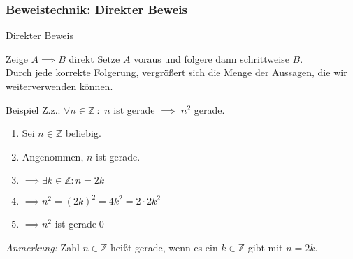 %
%
%
%

\subsubsection{Beweistechnik: Direkter Beweis}
\begin{frame}[fragile]{Direkter Beweis}
    \begin{alertblock}{Zeige $A\implies B$ direkt}
    Setze $A$ voraus und folgere dann schrittweise $B$.\\
    Durch jede korrekte Folgerung, vergrößert sich die Menge der Aussagen, die wir weiterverwenden können.
    \end{alertblock}
    \begin{exampleblock}{Beispiel}
    Z.z.: \alert<2|handout:0>{$\forall n\in\mathbb{Z}$}$\ :$ \alert<3|handout:0>{$n$ ist gerade} $\implies$ \alert<6|handout:0>{$n^2$ gerade.}
    \begin{enumerate}
        \item \alert<2|handout:0>{Sei $n\in\mathbb{Z}$ beliebig.}
        \item \alert<3|handout:0>{Angenommen, $n$ ist gerade.}
        \item \alert<4|handout:0>{$\implies \exists k\in\mathbb{Z} : n = 2k$}
        \item \alert<5|handout:0>{$\implies n^2 = (2k)^2 = 4k^2 = 2 \cdot 2k^2$}
        \item \alert<6|handout:0>{$\implies n^2$ ist gerade}\qed\;
    \end{enumerate}
    \end{exampleblock}
    \small{\emph{\alert<4|handout:0>{Anmerkung:}} Zahl $n\in\mathbb{Z}$ heißt gerade, wenn es ein $k\in\mathbb{Z}$ gibt mit $n=2k$.}
\end{frame}

